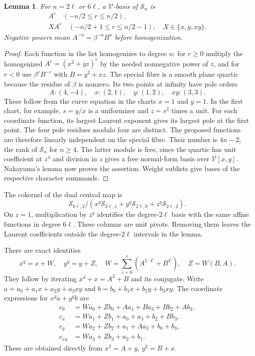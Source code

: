 \documentclass[11pt,a4paper,reqno]{amsart}
\numberwithin{equation}{section}
\theoremstyle{plain}
\newtheorem{lemma}[theorem]{Lemma}
\theoremstyle{definition}
\theoremstyle{remark}
\begin{document}
\begin{lemma}
For $n=2\ell$ or $6\ell$, a $\mathcal V$-basis of $\mathcal S_n$ is
\[
\begin{gathered} A^r\quad(-n/2\leq r\leq n/2),\\
XA^r\quad(-n/2+1\leq r\leq n/2-1),\quad X\in\{x,y,xy\}.\end{gathered}
\]
Negative powers mean $A^{-a}=\beta^{-a}B^a$ before homogenization.
\end{lemma}
\begin{proof}
Each function in the list homogenizes to degree $n$: for $r\geq0$ multiply the homogenized $A^r=(x^2+yz)^r$ by the needed nonnegative power of $z$, and for $r<0$ use $\beta^{r}B^{-r}$ with $B=y^2+xz$. The special fibre is a smooth plane quartic because the residue of $\beta$ is nonzero. Its two points at infinity have pole orders
\[
A:(4,-4),\quad x:(2,1),\quad y:(1,2),\quad xy:(3,3).
\]
These follow from the curve equation in the charts $x=1$ and $y=1$. In the first chart, for example, $s=y/x$ is a uniformizer and $z=s^2$ times a unit. For each coordinate function, its largest Laurent exponent gives its largest pole at the first point. The four pole residues modulo four are distinct. The proposed functions are therefore linearly independent on the special fibre. Their number is $4n-2$, the rank of $\mathcal S_n$ for $n\geq4$. The latter module is free, since the quartic has unit coefficient at $z^4$ and division in $z$ gives a free normal-form basis over $\mathcal V[x,y]$. Nakayama's lemma now proves the assertion. Weight sublists give bases of the respective character summands.
\end{proof}

The cokernel of the dual central map is
\[
\mathcal S_{6\ell,2}/(x^q\mathcal S_{2\ell,1}+y^q\mathcal S_{2\ell,0}+z^q\mathcal S_{2\ell,2}).
\]
On $z=1$, multiplication by $z^q$ identifies the degree-$2\ell$ basis
with the same affine functions in degree $6\ell$. These columns are unit
pivots. Removing them leaves the Laurent coefficients outside the
degree-$2\ell$ intervals in the lemma.

There are exact identities
\[
x^q=x+W,\quad y^q=y+Z,\quad
W=\sum_{i=0}^e(A^{2\cdot4^i}+B^{4^i}),\quad Z=W(B,A).
\]
They follow by iterating $x^4+x=A^2+B$ and its conjugate. Write
$a=a_0+a_1x+a_2y+a_3xy$ and $b=b_0+b_1x+b_2y+b_3xy$.
The coordinate expressions for $x^qa+y^qb$ are
\begin{align*}
c_0&=Wa_0+Zb_0+Aa_1+Ba_3+Bb_2+Ab_3,\\
c_x&=Wa_1+Zb_1+a_0+a_3+b_2+Bb_3,\\
c_y&=Wa_2+Zb_2+a_1+Aa_3+b_0+b_3,\\
c_{xy}&=Wa_3+Zb_3+a_2+b_1.
\end{align*}
These are obtained directly from $x^2=A+y$, $y^2=B+x$.
\end{document}
